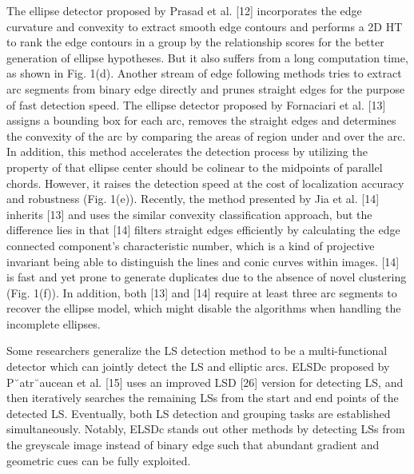 \documentclass[a4paper]{report}
\begin{document}
The
ellipse detector proposed by Prasad et al. [12] incorporates the
edge curvature and convexity to extract smooth edge contours
and performs a 2D HT to rank the edge contours in a group
by the relationship scores for the better generation of ellipse
hypotheses. But it also suffers from a long computation time,
as shown in Fig. 1(d).
Another stream of edge following methods tries to extract
arc segments from binary edge directly and prunes straight
edges for the purpose of fast detection speed. The ellipse
detector proposed by Fornaciari et al. [13] assigns a bounding
box for each arc, removes the straight edges and determines
the convexity of the arc by comparing the areas of region
under and over the arc. In addition, this method accelerates
the detection process by utilizing the property of that ellipse
center should be colinear to the midpoints of parallel chords.
However, it raises the detection speed at the cost of localization
accuracy and robustness (Fig. 1(e)). Recently, the method
presented by Jia et al. [14] inherits [13] and uses the similar
convexity classification approach, but the difference lies in
that [14] filters straight edges efficiently by calculating the
edge connected component’s characteristic number, which is a
kind of projective invariant being able to distinguish the lines
and conic curves within images. [14] is fast and yet prone
to generate duplicates due to the absence of novel clustering
(Fig. 1(f)). In addition, both [13] and [14] require at least three
arc segments to recover the ellipse model, which might disable
the algorithms when handling the incomplete ellipses.

Some researchers generalize the LS detection method to be
a multi-functional detector which can jointly detect the LS
and elliptic arcs. ELSDc proposed by P˘atr˘aucean et al. [15]
uses an improved LSD [26] version for detecting LS, and
then iteratively searches the remaining LSs from the start and
end points of the detected LS. Eventually, both LS detection
and grouping tasks are established simultaneously. Notably,
ELSDc stands out other methods by detecting LSs from the
greyscale image instead of binary edge such that abundant
gradient and geometric cues can be fully exploited.

 

\end{document}
